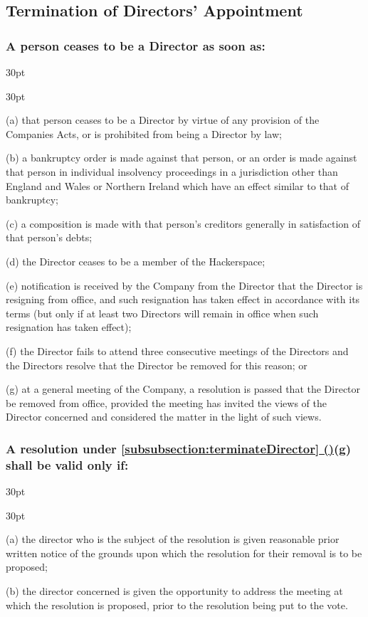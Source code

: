 \documentclass[12pt]{article}
\newcommand*{\fancyref}[1]{\hyperref[{#1}]{\autoref*{#1} (\nameref*{#1})}}
\def\clauseindent{30pt}
\newenvironment{subindentlist}{\raggedright\begin{adjustwidth}{\clauseindent}{}\begin{labeledlist}{\clauseindent}}{\end{labeledlist}\end{adjustwidth}}
\begin{document}
\subsection{Termination of Directors' Appointment}
\subsubsection[Automatic termination of Directors]{A person ceases to be a Director as soon as:}\label{subsubsection:terminateDirector}
\begin{subindentlist}
    \item [(a)] that person ceases to be a Director by virtue of any provision of the Companies Acts, or is prohibited from being a Director by law;
    \item [(b)] a bankruptcy order is made against that person, or an order is made against that person in individual insolvency proceedings in a jurisdiction other than England and Wales or Northern Ireland which have an effect similar to that of bankruptcy;
    \item [(c)] a composition is made with that person's creditors generally in satisfaction of that person's debts;
    \item [(d)] the Director ceases to be a member of the Hackerspace;
    \item [(e)] notification is received by the Company from the Director that the Director is resigning from office, and such resignation has taken effect in accordance with its terms (but only if at least two Directors will remain in office when such resignation has taken effect);
    \item [(f)] the Director fails to attend three consecutive meetings of the Directors and the Directors resolve that the Director be removed for this reason; or
    \item [(g)] at a general meeting of the Company, a resolution is passed that the Director be removed from office, provided the meeting has invited the views of the Director concerned and considered the matter in the light of such views.
\end{subindentlist}
\subsubsection[Specifics of Resolution to Terminate a Director]{A resolution under \fancyref{subsubsection:terminateDirector}(g) shall be valid only if:}
\begin{subindentlist}
    \item [(a)] the director who is the subject of the resolution is given reasonable prior written notice of the grounds upon which the resolution for their removal is to be proposed;
    \item [(b)] the director concerned is given the opportunity to address the meeting at which the resolution is proposed, prior to the resolution being put to the vote.
\end{subindentlist}
\end{document}
